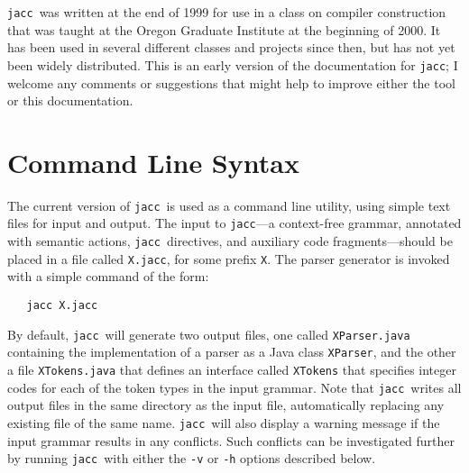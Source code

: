 \documentclass[12pt]{article}
\def\jacc{{\tt jacc}}
\begin{document}
\jacc\ was written at the end of 1999 for use in a class on
compiler construction that was taught at the Oregon Graduate
Institute at the beginning of 2000.  It has been used
in several different classes and projects since then, but has not
yet been widely distributed.  This is an early version of the
documentation for \jacc; I welcome any comments or suggestions
that might help to improve either the tool or this documentation.

\section{Command Line Syntax}
The current version of \jacc\ is used as a command line utility,
using simple text files for input and output.  The input to
\jacc---a context-free grammar, annotated with semantic actions,
\jacc\ directives, and auxiliary code fragments---should be
placed in a file called \verb"X.jacc", for some prefix \verb"X".
The parser generator is invoked with a simple command
of the form:
\begin{verbatim}
   jacc X.jacc
\end{verbatim}
By default, \jacc\ will generate two output files, one
called \verb"XParser.java" containing the implementation
of a parser as a Java class \verb"XParser", and the other a
file \verb"XTokens.java" that defines an interface called
\verb"XTokens" that specifies integer codes for each of the
token types in the input grammar.  Note that \jacc\ writes
all output files in the same directory as the input file,
automatically replacing any existing file of the same name.
\jacc\ will also display a warning message if the input
grammar results in any conflicts.  Such conflicts can be
investigated further by running \jacc\ with either the
\verb"-v" or \verb"-h" options described below.
\end{document}
